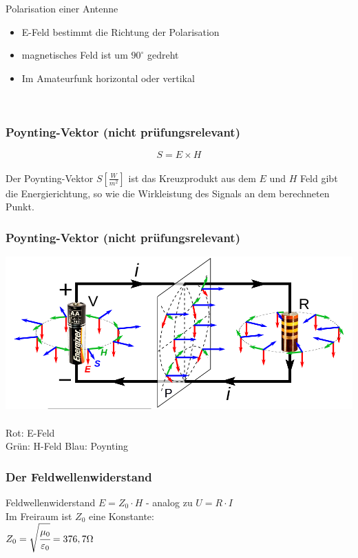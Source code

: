 \begin{frame}
\begin{center}
\begin{minipage}{0.45\textwidth}
      {\tiny Polarisation einer Antenne}
      \begin{itemize}
	\item E-Feld bestimmt die Richtung der Polarisation
	\item magnetisches Feld ist um $90^\circ$ gedreht
	\item Im Amateurfunk horizontal oder vertikal
      \end{itemize}
    \end{minipage}\\[1.5em]
  \end{center}
\end{frame}

\begin{frame}
    \frametitle{Poynting-Vektor (nicht prüfungsrelevant)}
    \begin{center}
		\huge $$S = E \times H$$ \\[1em]
		\large Der Poynting-Vektor $S[\frac{W}{m^2}]$ ist das Kreuzprodukt aus dem $E$ und $H$ Feld gibt die Energierichtung, so wie die Wirkleistung des Signals an dem berechneten Punkt.
	\end{center}
\end{frame}

\begin{frame}
    \frametitle{Poynting-Vektor (nicht prüfungsrelevant)}
    \begin{center}
		\includegraphics[width=1\textwidth]{a08/Poynting_vectors_of_DC_circuit.png}\\
		\tiny \hyperlink{refs}{\cite{wm}} \\[1em] \large
		Rot: E-Feld \\
		Grün: H-Feld
		Blau: Poynting
	\end{center}
\end{frame}

\begin{frame}
    \frametitle{Der Feldwellenwiderstand}
    \begin{block}{Feldwellenwiderstand}
      $E = Z_0 \cdot H$ \vspace{2cm} - analog zu $U = R \cdot I$ \\[1em]
      Im Freiraum ist $Z_0$ eine Konstante: \\[1em]
      $Z_0 = \sqrt{\cfrac{\mu_0}{\varepsilon_0}} = 376,7 \Omega$ \\[1em]
  \end{block}
\end{frame}

